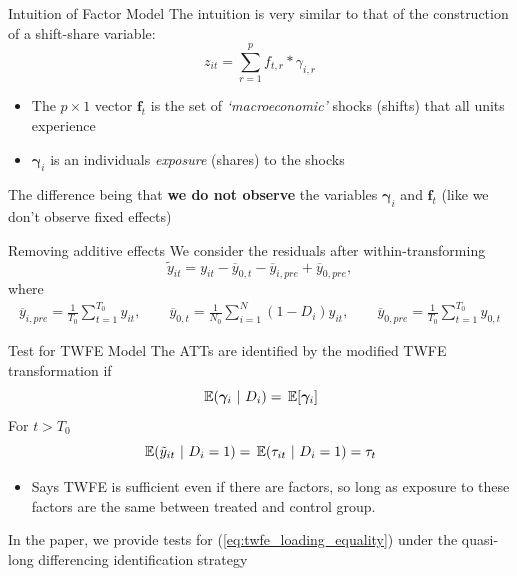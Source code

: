 \documentclass[aspectratio=169,t,11pt]{beamer}
\begin{document}
\begin{frame}{Intuition of Factor Model}\label{slide:appendix-shift_share}
  The intuition is very similar to that of the construction of a shift-share variable:
  $$
    z_{it} = \sum_{r = 1}^{p} f_{t,r} * \gamma_{i,r}
  $$
  \vspace{-5mm}
  \begin{itemize}
    \item The $p \times 1$ vector $\bm{f}_t$ is the set of \emph{`macroeconomic'} shocks (shifts) that all units experience
    \item $\bm{\gamma}_i$ is an individuals \emph{exposure} (shares) to the shocks 
  \end{itemize}

  \bigskip
  The difference being that \textbf{we do not observe} the variables $\bm{\gamma}_i$ and $\bm{f}_t$ (like we don't observe fixed effects)

\end{frame}
  
\begin{frame}{Removing additive effects}\label{slide:appendix-remove_additive_fe}
  We consider the residuals after within-transforming
  $$
    \tilde{y}_{it} = y_{it} - \overline{y}_{0,t} - \overline{y}_{i,pre} + \overline{y}_{0,pre},
  $$
  where
  \begin{gather*}
    \overline{y}_{i, pre} = \frac{1}{T_0} \sum_{t = 1}^{T_0} y_{it}, \qquad
    \overline{y}_{0, t} = \frac{1}{N_{0}} \sum_{i = 1}^N (1 - D_i) y_{it}, \qquad
    \overline{y}_{0, pre} = \frac{1}{T_0} \sum_{t = 1}^{T_0} y_{0, t}
  \end{gather*}

\end{frame}

\begin{frame}{Test for TWFE Model}\label{slide:twfe_test}
  The ATTs are identified by the modified TWFE transformation if
  \begin{equation}\label{eq:twfe_loading_equality}
    \expec{\bm{\gamma}_i}{D_i} = \expec{\bm{\gamma}_i}
  \end{equation}
  For $t > T_0$
  $$
    \expec{\tilde{y}_{it}}{D_i = 1} = \expec{\tau_{it}}{D_i = 1} = \tau_t
  $$
  
  \begin{itemize}
    \item Says TWFE is sufficient even if there are factors, so long as exposure to these factors are the same between treated and control group.
  \end{itemize}

  
  \medskip
  In the paper, we provide tests for (\ref{eq:twfe_loading_equality}) under the quasi-long differencing identification strategy

\end{frame}
\end{document}
